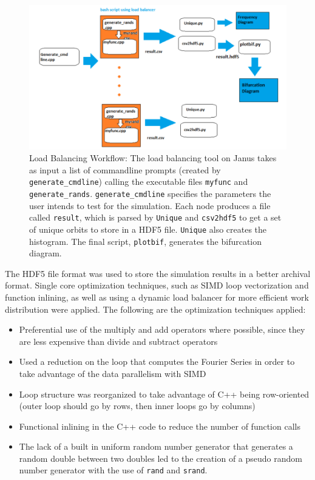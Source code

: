 \begin{figure}[htp]
\caption[Load balancing workflow]{Load Balancing Workflow: The load
  balancing tool on Janus takes as input a list of commandline prompts
  (created by \texttt{generate\_cmdline}) calling the
  executable files \texttt{myfunc} and
  \texttt{generate\_rands}. \texttt{generate\_cmdline}
  specifies the parameters the user intends to test for the
  simulation. Each node produces a file called \texttt{result},
  which is parsed by \texttt{Unique} and \texttt{csv2hdf5} to get
  a set of unique orbits to store in a HDF5 file. \texttt{Unique} also creates the histogram. The final script, \texttt{plotbif}, generates the bifurcation diagram.}\label{fig:workflow}
	\begin{center}
          \includegraphics[scale=0.5]{figs/workflow.png}
	\end{center}
\end{figure}

The HDF5 file format was used to store the simulation results in a better
archival format. Single core optimization techniques, such as SIMD loop
vectorization and function inlining, as well as using a dynamic load
balancer for more efficient work distribution were
applied. The following are the optimization techniques applied:
\begin{itemize}
\item Preferential use of the multiply and add operators where possible, since
they are less expensive than divide and subtract operators
\item Used a reduction on the loop that computes the Fourier Series
  in order to take advantage of the data parallelism with SIMD
\item Loop structure was reorganized to take advantage of C++ being
  row-oriented (outer loop should go by rows, then inner loops go by columns)
\item Functional inlining in the C++ code to reduce the number of function calls
\item The lack of a built in uniform random number generator that generates a random
double between two doubles led to the creation of a pseudo random number
generator with the use of \texttt{rand} and \texttt{srand}.
\end{itemize}

